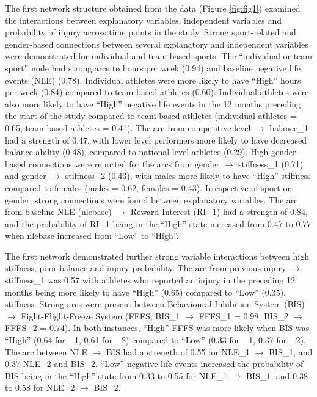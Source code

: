 \documentclass[
  english,
  man]{apa6}
\begin{document}
The first network structure obtained from the data (Figure \ref{fig:fig1}) examined the interactions between explanatory variables, independent variables and probability of injury across time points in the study.
Strong sport-related and gender-based connections between several explanatory and independent variables were demonstrated for individual and team-based sports.
The ``individual or team sport'' node had strong arcs to hours per week (0.94) and baseline negative life events (NLE) (0.78).
Individual athletes were more likely to have ``High'' hours per week (0.84) compared to team-based athletes (0.60).
Individual athletes were also more likely to have ``High'' negative life events in the 12 months preceding the start of the study compared to team-based athletes (individual athletes = 0.65, team-based athletes = 0.41).
The arc from competitive level \(\rightarrow\) balance\_1 had a strength of 0.47, with lower level performers more likely to have decreased balance ability (0.48), compared to national level athletes (0.29).
High gender-based connections were reported for the arcs from gender \(\rightarrow\) stiffness\_1 (0.71) and gender \(\rightarrow\) stiffness\_2 (0.43), with males more likely to have ``High'' stiffness compared to females (males = 0.62, females = 0.43).
Irrespective of sport or gender, strong connections were found between explanatory variables.
The arc from baseline NLE (nlebase) \(\rightarrow\) Reward Interest (RI\_1) had a strength of 0.84, and the probability of RI\_1 being in the ``High'' state increased from 0.47 to 0.77 when nlebase increased from ``Low'' to ``High''.

The first network demonstrated further strong variable interactions between high stiffness, poor balance and injury probability.
The arc from previous injury \(\rightarrow\) stiffness\_1 was 0.57 with athletes who reported an injury in the preceding 12 months being more likely to have ``High'' (0.65) compared to ``Low'' (0.35).
stiffness.
Strong arcs were present between Behavioural Inhibition System (BIS) \(\rightarrow\) Fight-Flight-Freeze System (FFFS; BIS\_1 \(\rightarrow\) FFFS\_1 = 0.98, BIS\_2 \(\rightarrow\) FFFS\_2 = 0.74).
In both instances, ``High'' FFFS was more likely when BIS was ``High'' (0.64 for \_1, 0.61 for \_2) compared to ``Low'' (0.33 for \_1, 0.37 for \_2).
The arc between NLE \(\rightarrow\) BIS had a strength of 0.55 for NLE\_1 \(\rightarrow\) BIS\_1, and 0.37 NLE\_2 and BIS\_2.
``Low'' negative life events increased the probability of BIS being in the ``High'' state from 0.33 to 0.55 for NLE\_1 \(\rightarrow\) BIS\_1, and 0.38 to 0.58 for NLE\_2 \(\rightarrow\) BIS\_2.
\end{document}
